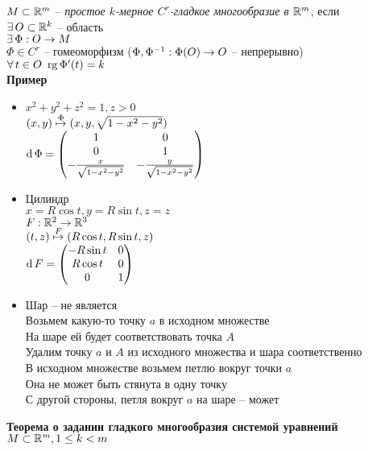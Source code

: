 \documentclass[12pt]{article}
\begin{document}
$M \subset \mathbb{R}^m$ -- \textit{простое $k$-мерное $C^r$-гладкое многообразие в $\mathbb{R}^m$}, если\\
$\exists\, O \subset \mathbb{R}^k$ -- область\\
$\exists\, \Phi: O \rightarrow M$\\
$\Phi \in C^r$ -- гомеоморфизм ($\Phi, \Phi^{-1}: \Phi(O)\rightarrow O$ -- непрерывно)\\
$\forall\, t \in O\ \operatorname{rg} \Phi'(t) = k$\\
\textbf{Пример}
\begin{itemize}
    \item $x^2+y^2+z^2 = 1, z > 0$\\
    $(x,y) \overset \Phi \mapsto (x,y, \sqrt{1-x^2-y^2})$\\
    $\operatorname{d} \Phi = \begin{pmatrix}
        1 & 0\\
        0 & 1\\
        -\frac{x}{\sqrt{1-x^2-y^2}} & -\frac{y}{\sqrt{1-x^2-y^2}}
    \end{pmatrix}$
    \item Цилиндр\\
    $x=R\cos t, y = R\sin t, z = z$\\
    $F: \mathbb{R}^2 \rightarrow \mathbb{R}^3$\\
    $(t, z) \overset F\mapsto (R\cos t, R\sin t, z)$\\
    $\operatorname{d} F = \begin{pmatrix}
        -R\sin t & 0\\
        R\cos t & 0\\
        0 & 1
    \end{pmatrix}$
    \item Шар -- не является\\
    Возьмем какую-то точку $a$ в исходном множестве\\
    На шаре ей будет соответствовать точка $A$\\
    Удалим точку $a$ и $A$ из исходного множества и шара соответственно\\
    В исходном множестве возьмем петлю вокруг точки $a$\\
    Она не может быть стянута в одну точку\\
    С другой стороны, петля вокруг $a$ на шаре -- может
\end{itemize}
\textbf{Теорема о задании гладкого многообразия системой уравнений}\\
$M\subset \mathbb{R}^m, 1 \leq k < m$\\
\end{document}
